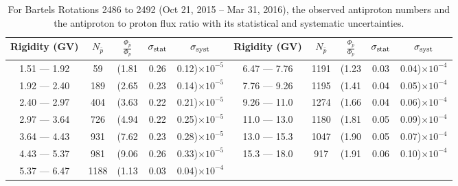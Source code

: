 \begin{table}[p] 
\renewcommand\baselinestretch{1.3}\selectfont
\setlength\tabcolsep{3pt}
\centering
\begin{tabular}{ccccc | ccccc}
\hline
\textbf{Rigidity}  (GV)  & $N_{\bar{p}}$ & $\frac{\Phi_{\bar{p}}}{\Phi_{p}}$ & $\sigma_{\rm{stat}}$ & $\sigma_{\rm{syst}}$ \hspace{1cm}   & \textbf{Rigidity}  (GV)  & $N_{\bar{p}}$ & $\frac{\Phi_{\bar{p}}}{\Phi_{p}}$ & $\sigma_{\rm{stat}}$ & $\sigma_{\rm{syst}}$ \hspace{1cm} \\ 
\hline
1.51 — 1.92   &  59                  &(1.81                          &  0.26              &      0.12)$\times 10^{-5}$  & 6.47 — 7.76                &  1191                    &(1.23                                &  0.03                   &      0.04)$\times 10^{-4}$\\
1.92 — 2.40   &  189                &(2.65                          &  0.23              &      0.14)$\times 10^{-5}$  & 7.76 — 9.26                &  1195                    &(1.41                                &  0.04                   &      0.05)$\times 10^{-4}$\\
2.40 — 2.97   &  404                &(3.63                          &  0.22              &      0.21)$\times 10^{-5}$  & 9.26 — 11.0                &  1274                    &(1.66                                &  0.04                   &      0.06)$\times 10^{-4}$\\    
2.97 — 3.64   &  726                &(4.94                          &  0.22              &      0.25)$\times 10^{-5}$  & 11.0 — 13.0                 &  1180                    &(1.81                                &  0.05                   &      0.09)$\times 10^{-4}$\\    
3.64 — 4.43   &  931                &(7.62                          &  0.23              &      0.28)$\times 10^{-5}$  & 13.0 — 15.3               &  1047                    &(1.90                                &  0.05                   &      0.07)$\times 10^{-4}$\\
4.43 — 5.37   &  981                &(9.06                          &  0.26              &      0.33)$\times 10^{-5}$  & 15.3 — 18.0               &  917                      &(1.91                                &  0.06                   &      0.10)$\times 10^{-4}$\\
5.37 — 6.47   &  1188              &(1.13                          &  0.03              &      0.04)$\times 10^{-4}$  & \\
\hline
\end{tabular}
\caption[Antiproton to proton flux ratio for Bartels Rotations 2486 to 2492]{For Bartels Rotations 2486 to 2492 (Oct 21, 2015 – Mar 31, 2016), the observed antiproton numbers and the antiproton to proton flux ratio with its statistical and systematic uncertainties.}
\label{TableOfDependent11}
\end{table}

